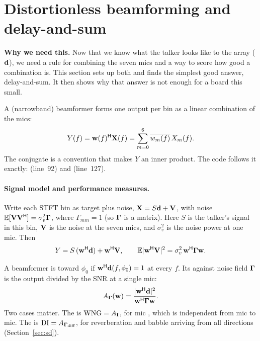 \documentclass[11pt]{article}
\begin{document}
\section{Distortionless beamforming and delay-and-sum}\label{sec:das}

\noindent\textbf{Why we need this.} Now that we know what the talker looks like to the array
($\mathbf{d}$), we need a rule for combining the seven mics and a way to score how good a combination is.
This section sets up both and finds the simplest good answer, delay-and-sum. It then shows why
that answer is not enough for a board this small.

A (narrowband) beamformer forms one output per bin as a linear combination of the mics:
\begin{equation}\label{eq:beam}
  Y(f)=\mathbf{w}(f)^{\mathsf H}\mathbf{X}(f)=\sum_{m=0}^{6}\overline{w_m(f)}\,X_m(f).
\end{equation}
The conjugate is a convention that makes $Y$ an inner product. The code follows it exactly:
 (line~92) and  (line~127).

\paragraph{Signal model and performance measures.}
Write each STFT bin as target plus noise, $\mathbf{X}=S\mathbf{d}+\mathbf{V}$, with noise
 $\mathbb{E}[\mathbf{V}\mathbf{V}^{\mathsf H}]=\sigma_v^2\bm{\Gamma}$, where $\Gamma_{mm}=1$ (so $\bm{\Gamma}$ is a
 matrix). Here $S$ is the talker's signal in this bin, $\mathbf{V}$ is the
noise at the seven mics, and $\sigma_v^2$ is the noise power at one mic. Then
\begin{equation}
  Y=S\,(\mathbf{w}^{\mathsf H}\mathbf{d})+\mathbf{w}^{\mathsf H}\mathbf{V},\qquad
  \mathbb{E}|\mathbf{w}^{\mathsf H}\mathbf{V}|^2=\sigma_v^2\,\mathbf{w}^{\mathsf H}\bm{\Gamma}\mathbf{w} .
\end{equation}

\begin{definition}
A beamformer is  toward $\phi_0$ if $\mathbf{w}^{\mathsf H}\mathbf{d}(f,\phi_0)=1$
at every $f$. Its  against noise field $\bm{\Gamma}$ is the output
 divided by the SNR at a single mic:
\begin{equation}\label{eq:gain}
  A_{\bm{\Gamma}}(\mathbf{w})=\frac{|\mathbf{w}^{\mathsf H}\mathbf{d}|^2}{\mathbf{w}^{\mathsf H}\bm{\Gamma}\mathbf{w}}.
\end{equation}
Two cases matter. The  is $\mathrm{WNG}=A_{\mathbf{I}}$, for mic
, which is independent from mic to mic. The
 is $\mathrm{DI}=A_{\bm{\Gamma}_{\mathrm{diff}}}$, for reverberation and babble
arriving from all directions (Section~\ref{sec:sd}).
\end{definition}
\end{document}
